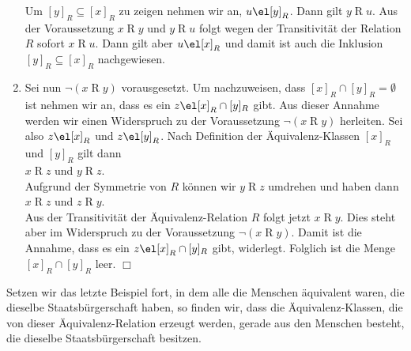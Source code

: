 \begin{enumerate}
      Um $[y]_R \subseteq [x]_R$ zu zeigen nehmen wir an, $u \el [y]_R$.
      Dann gilt $y \mathop{R} u$.  Aus der Voraussetzung $x \mathop{R} y$ und
      $y \mathop{R} u$ folgt wegen der Transitivität der Relation $R$ sofort
      $x \mathop{R} u$.  Dann gilt aber $u \el [x]_R$ und damit ist auch die Inklusion
      $[y]_R \subseteq [x]_R$ nachgewiesen.
\item Sei nun $\neg (x \mathop{R} y)$ vorausgesetzt.  Um nachzuweisen,
      dass  $[x]_R \cap [y]_R = \emptyset$ ist nehmen wir an, dass
      es ein $z \el [x]_R \cap [y]_R$ gibt.  Aus dieser Annahme werden wir einen
      Widerspruch zu der Voraussetzung $\neg (x \mathop{R} y)$ 
        herleiten.  Sei also $z \el[x]_R$ und $z \el [y]_R$.  Nach Definition
        der Äquivalenz-Klassen $[x]_R$ und $[y]_R$ gilt dann 
      \\[0.2cm]
      \hspace*{1.3cm}      
      $x \mathop{R} z$ \quad und \quad $y \mathop{R} z$.
      \\[0.2cm]
      Aufgrund der Symmetrie von $R$ können wir $y \mathop{R} z$ umdrehen und haben dann
      \\[0.2cm]
      \hspace*{1.3cm}      
      $x \mathop{R} z$ \quad und \quad $z \mathop{R} y$.
      \\[0.2cm]
      Aus der Transitivität der Äquivalenz-Relation $R$ folgt jetzt
      $x \mathop{R} y$.
      Dies steht aber im Widerspruch zu der Voraussetzung $\neg (x \mathop{R} y)$.
      Damit ist die Annahme, dass es ein $z \el [x]_R \cap [y]_R$ gibt, widerlegt.
      Folglich ist die Menge $[x]_R \cap [y]_R$ leer.
      \hspace*{\fill} $\Box$
\end{enumerate}

\example
Setzen wir das letzte Beispiel fort, in dem alle die Menschen äquivalent waren, die dieselbe
Staatsbürgerschaft haben, so finden wir, dass die Äquivalenz-Klassen, die von dieser
Äquivalenz-Relation erzeugt werden, gerade aus den Menschen besteht, die dieselbe
Staatsbürgerschaft besitzen.


